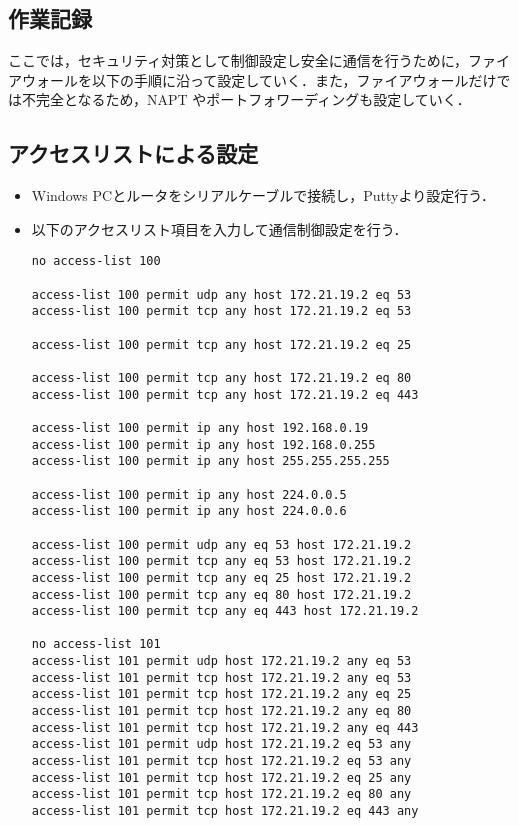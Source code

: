 \documentclass[a4j,titlepage]{jarticle}
\begin{document}
\begin{itemize}
\section{作業記録}
ここでは，セキュリティ対策として制御設定し安全に通信を行うために，ファイアウォールを以下の手順に沿って設定していく．また，ファイアウォールだけでは不完全となるため，NAPT やポートフォワーディングも設定していく．

\subsection{アクセスリストによる設定}
\begin{itemize}
\item Windows PCとルータをシリアルケーブルで接続し，Puttyより設定行う．

  \item 以下のアクセスリスト項目を入力して通信制御設定を行う．
\begin{screen}
    \begin{center}
\begin{verbatim}
no access-list 100

access-list 100 permit udp any host 172.21.19.2 eq 53
access-list 100 permit tcp any host 172.21.19.2 eq 53

access-list 100 permit tcp any host 172.21.19.2 eq 25

access-list 100 permit tcp any host 172.21.19.2 eq 80
access-list 100 permit tcp any host 172.21.19.2 eq 443

access-list 100 permit ip any host 192.168.0.19
access-list 100 permit ip any host 192.168.0.255
access-list 100 permit ip any host 255.255.255.255

access-list 100 permit ip any host 224.0.0.5
access-list 100 permit ip any host 224.0.0.6

access-list 100 permit udp any eq 53 host 172.21.19.2
access-list 100 permit tcp any eq 53 host 172.21.19.2
access-list 100 permit tcp any eq 25 host 172.21.19.2
access-list 100 permit tcp any eq 80 host 172.21.19.2
access-list 100 permit tcp any eq 443 host 172.21.19.2

no access-list 101
access-list 101 permit udp host 172.21.19.2 any eq 53
access-list 101 permit tcp host 172.21.19.2 any eq 53
access-list 101 permit tcp host 172.21.19.2 any eq 25
access-list 101 permit tcp host 172.21.19.2 any eq 80
access-list 101 permit tcp host 172.21.19.2 any eq 443 
access-list 101 permit udp host 172.21.19.2 eq 53 any
access-list 101 permit tcp host 172.21.19.2 eq 53 any
access-list 101 permit tcp host 172.21.19.2 eq 25 any
access-list 101 permit tcp host 172.21.19.2 eq 80 any
access-list 101 permit tcp host 172.21.19.2 eq 443 any
\end{verbatim}
    \end{center}
  \end{screen}


\end{itemize}
\end{itemize}
\end{document}
